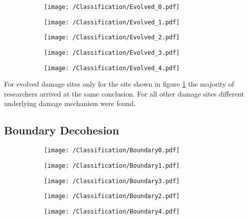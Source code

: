 \begin{figure}[H]
\begin{subfigure}{.2\textwidth}
\centering
  \texttt{[image: /Classification/Evolved\_0.pdf]}
  \caption{}
  \label{fig:Ev1}
\end{subfigure}%
\begin{subfigure}{.2\textwidth}
\centering
  \texttt{[image: /Classification/Evolved\_1.pdf]}
  \caption{}
  \label{fig:Ev2}
\end{subfigure}%
\centering
\begin{subfigure}{.2\textwidth}
\centering
  \texttt{[image: /Classification/Evolved\_2.pdf]}
  \caption{}
  \label{fig:Ev3}
\end{subfigure}%
\begin{subfigure}{.2\textwidth}
\centering
  \texttt{[image: /Classification/Evolved\_3.pdf]}
  \caption{}
  \label{fig:Ev4}
\end{subfigure}%
\begin{subfigure}{.2\textwidth}
\centering
  \texttt{[image: /Classification/Evolved\_4.pdf]}
  \caption{}
  \label{fig:Ev5}
\end{subfigure}%
\caption{}
\label{fig:classes}
\end{figure}



For evolved damage sites only for the site shown in figure \ref{fig:Ev1} the majority of researchers arrived at the same conclusion. For all other damage sites different underlying damage mechanism were found.

\subsection{Boundary Decohesion}

\begin{figure}[H]
\begin{subfigure}{.2\textwidth}
\centering
  \texttt{[image: /Classification/Boundary0.pdf]}
  \caption{}
  \label{fig:BD1}
\end{subfigure}%
\begin{subfigure}{.2\textwidth}
\centering
  \texttt{[image: /Classification/Boundary1.pdf]}
  \caption{}
  \label{fig:BD2}
\end{subfigure}%
\centering
\begin{subfigure}{.2\textwidth}
\centering
  \texttt{[image: /Classification/Boundary3.pdf]}
  \caption{}
  \label{fig:BD3}
\end{subfigure}%
\begin{subfigure}{.2\textwidth}
\centering
  \texttt{[image: /Classification/Boundary2.pdf]}
  \caption{}
  \label{fig:BD4}
\end{subfigure}%
\begin{subfigure}{.2\textwidth}
\centering
  \texttt{[image: /Classification/Boundary4.pdf]}
  \caption{}
  \label{fig:BD5}
\end{subfigure}%
\caption{}
\label{fig:BD}
\end{figure}

